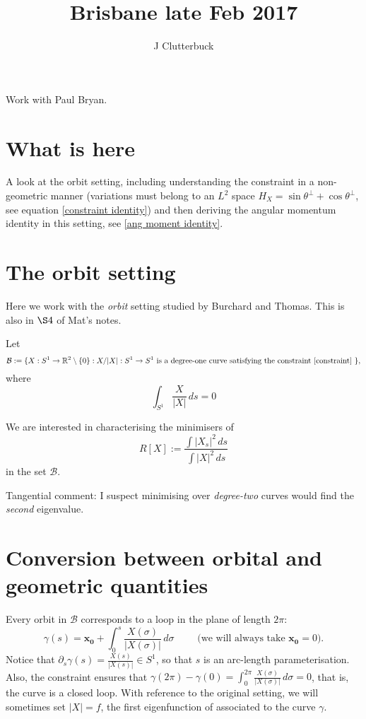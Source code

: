 \documentclass[12pt, a4paper]{amsart}
\author{J Clutterbuck}
\theoremstyle{remark}
\begin{document}
  



\title{Brisbane late Feb 2017  }
\maketitle

{Work with Paul Bryan.}

\section*{What is here}

A look at the orbit setting, including understanding the constraint in a non-geometric manner (variations must belong to an $L^2$ space $H_X=\sin\theta^\perp +\cos\theta^\perp$, see equation \eqref{constraint identity}) and then deriving the angular momentum identity in this setting, see \eqref{ang moment identity}.



\section*{The orbit setting}

Here we work with the \emph{orbit} setting studied by Burchard and Thomas.   This is also in $\S 4$ of Mat's notes.

Let $$\mathcal{B}:=\lbrace X:S^1\rightarrow \mathbb{R}^2\setminus \lbrace 0\rbrace:   X/|X|:S^1\rightarrow S^1 \text{ is a degree-one curve satisfying the constraint \eqref{constraint} } \rbrace ,$$
where 
\begin{equation}
\tag{C}    \int_{S^1} \frac{X}{|X|}\,ds=0 \label{constraint}
\end{equation}

We are interested in characterising the minimisers of 
$$R[X]:= \frac{ \int |X_s|^2 \,ds}{\int |X|^2\,ds}$$
in the set $\mathcal{B}$.   

Tangential comment:   I suspect minimising over \emph{degree-two} curves would find the \emph{second} eigenvalue.

\section*{Conversion between orbital and geometric quantities}

Every orbit in $\mathcal{B}$ corresponds to a loop in the plane of length $2\pi$:
$$\gamma(s)=\mathbf{x_0}+\int_0^s \frac{X(\sigma)}{|X(\sigma)|} \,d\sigma \quad\quad \text{ (we will always take $\mathbf{x_0}=0$).}$$
Notice that $\partial_s \gamma(s)=\frac{X(s)}{|X(s)|}\in S^1$, so that $s$ is an arc-length parameterisation.   Also, the constraint ensures that $\gamma(2\pi)-\gamma(0)=\int_0^{2\pi} \frac{X(\sigma)}{|X(\sigma)|}\,d\sigma =0$, that is, the curve is a closed loop.       With reference to the original setting, we will sometimes set $|X|=f$, the first eigenfunction of associated to the curve $\gamma$.
\end{document}
